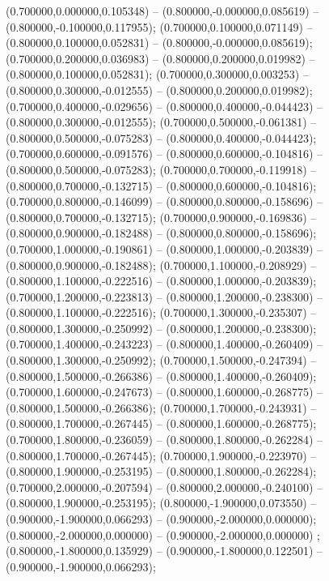  (0.700000,0.000000,0.105348) -- (0.800000,-0.000000,0.085619) -- (0.800000,-0.100000,0.117955);
 (0.700000,0.100000,0.071149) -- (0.800000,0.100000,0.052831) -- (0.800000,-0.000000,0.085619);
 (0.700000,0.200000,0.036983) -- (0.800000,0.200000,0.019982) -- (0.800000,0.100000,0.052831);
 (0.700000,0.300000,0.003253) -- (0.800000,0.300000,-0.012555) -- (0.800000,0.200000,0.019982);
 (0.700000,0.400000,-0.029656) -- (0.800000,0.400000,-0.044423) -- (0.800000,0.300000,-0.012555);
 (0.700000,0.500000,-0.061381) -- (0.800000,0.500000,-0.075283) -- (0.800000,0.400000,-0.044423);
 (0.700000,0.600000,-0.091576) -- (0.800000,0.600000,-0.104816) -- (0.800000,0.500000,-0.075283);
 (0.700000,0.700000,-0.119918) -- (0.800000,0.700000,-0.132715) -- (0.800000,0.600000,-0.104816);
 (0.700000,0.800000,-0.146099) -- (0.800000,0.800000,-0.158696) -- (0.800000,0.700000,-0.132715);
 (0.700000,0.900000,-0.169836) -- (0.800000,0.900000,-0.182488) -- (0.800000,0.800000,-0.158696);
 (0.700000,1.000000,-0.190861) -- (0.800000,1.000000,-0.203839) -- (0.800000,0.900000,-0.182488);
 (0.700000,1.100000,-0.208929) -- (0.800000,1.100000,-0.222516) -- (0.800000,1.000000,-0.203839);
 (0.700000,1.200000,-0.223813) -- (0.800000,1.200000,-0.238300) -- (0.800000,1.100000,-0.222516);
 (0.700000,1.300000,-0.235307) -- (0.800000,1.300000,-0.250992) -- (0.800000,1.200000,-0.238300);
 (0.700000,1.400000,-0.243223) -- (0.800000,1.400000,-0.260409) -- (0.800000,1.300000,-0.250992);
 (0.700000,1.500000,-0.247394) -- (0.800000,1.500000,-0.266386) -- (0.800000,1.400000,-0.260409);
 (0.700000,1.600000,-0.247673) -- (0.800000,1.600000,-0.268775) -- (0.800000,1.500000,-0.266386);
 (0.700000,1.700000,-0.243931) -- (0.800000,1.700000,-0.267445) -- (0.800000,1.600000,-0.268775);
 (0.700000,1.800000,-0.236059) -- (0.800000,1.800000,-0.262284) -- (0.800000,1.700000,-0.267445);
 (0.700000,1.900000,-0.223970) -- (0.800000,1.900000,-0.253195) -- (0.800000,1.800000,-0.262284);
 (0.700000,2.000000,-0.207594) -- (0.800000,2.000000,-0.240100) -- (0.800000,1.900000,-0.253195);
 (0.800000,-1.900000,0.073550) -- (0.900000,-1.900000,0.066293) -- (0.900000,-2.000000,0.000000);
 (0.800000,-2.000000,0.000000) -- (0.900000,-2.000000,0.000000) ;
 (0.800000,-1.800000,0.135929) -- (0.900000,-1.800000,0.122501) -- (0.900000,-1.900000,0.066293);
